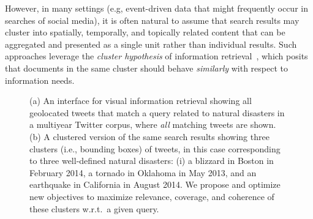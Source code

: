 However, in many settings (e.g, event-driven data that might frequently occur in searches of social media), it is often natural to assume that search results may cluster into spatially, temporally, and topically related content that can be aggregated and presented as a single unit rather than individual results.  
Such approaches leverage the \emph{cluster hypothesis} of information retrieval~\cite{Salton1971,Jardine1971,Voorhees1985,Manning2008}, which posits that documents in the same cluster should behave \emph{similarly} with respect to information needs.  

\begin{figure}[t]
\begin{centering}
\par\end{centering}
\caption{(a) An interface for visual information retrieval showing all geolocated tweets that match a query related to natural disasters in a multiyear Twitter corpus, where \emph{all} matching tweets are shown.
(b) A clustered version of the same search results showing three clusters (i.e., bounding boxes) of tweets, in this case corresponding to three well-defined natural disasters: (i) a blizzard in Boston in February 2014, a tornado in Oklahoma in May 2013, and an earthquake in California in August 2014.  We propose and optimize new objectives to  maximize relevance, coverage, and coherence of these clusters w.r.t.\ a given query.}
\label{Fig:UseCase}
\end{figure}


